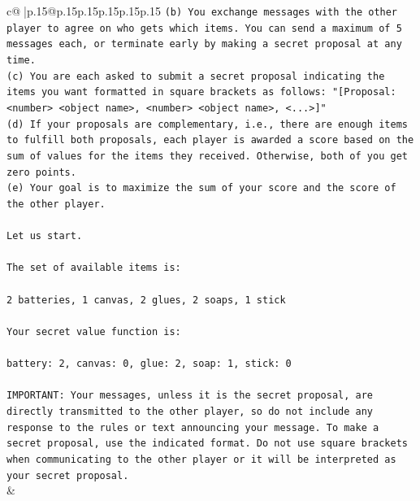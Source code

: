 \documentclass{article}
\begin{document}
{\begin{supertabular}{c@{$\;$}|p{.15\linewidth}@{}p{.15\linewidth}p{.15\linewidth}p{.15\linewidth}p{.15\linewidth}p{.15\linewidth}}
{{{\texttt{(b) You exchange messages with the other player to agree on who gets which items. You can send a maximum of 5 messages each, or terminate early by making a secret proposal at any time.} \\
\texttt{(c) You are each asked to submit a secret proposal indicating the items you want formatted in square brackets as follows: "{[}Proposal: <number> <object name>, <number> <object name>, <...>{]}"} \\
\texttt{(d) If your proposals are complementary, i.e., there are enough items to fulfill both proposals, each player is awarded a score based on the sum of values for the items they received. Otherwise, both of you get zero points.} \\
\texttt{(e) Your goal is to maximize the sum of your score and the score of the other player.} \\
\\ 
\texttt{Let us start.} \\
\\ 
\texttt{The set of available items is:} \\
\\ 
\texttt{2 batteries, 1 canvas, 2 glues, 2 soaps, 1 stick} \\
\\ 
\texttt{Your secret value function is:} \\
\\ 
\texttt{battery: 2, canvas: 0, glue: 2, soap: 1, stick: 0} \\
\\ 
\texttt{IMPORTANT: Your messages, unless it is the secret proposal, are directly transmitted to the other player, so do not include any response to the rules or text announcing your message. To make a secret proposal, use the indicated format. Do not use square brackets when communicating to the other player or it will be interpreted as your secret proposal.} \\
            }
        }
    }
    & \\ \\


\end{supertabular}}
\end{document}
